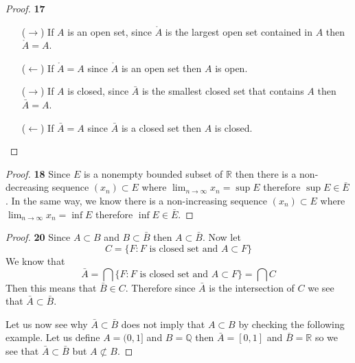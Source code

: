 \documentclass[11pt]{article}
\newcommand{\Q}{\mathbb{Q}}
\newcommand{\R}{\mathbb{R}}
\theoremstyle{definition}
\begin{document}
	\begin{proof}{\textbf{17}}
        \begin{itemize}
        \item [($\rightarrow$)] If $A$ is an open set, since $\mathring{A}$ is the
        largest open set contained in $A$ then $\mathring{A} = A$.
        \item [($\leftarrow$)] If $\mathring{A} = A$ since $\mathring{A}$ is an open set
        then $A$ is open.
        \end{itemize}
        \begin{itemize}
        \item [($\rightarrow$)] If $A$ is closed, since $\bar{A}$ is the smallest closed
        set that contains $A$ then $\bar{A} = A$.
        \item [($\leftarrow$)] If $\bar{A} = A$ since $\bar{A}$ is a closed set
        then $A$ is closed.
        \end{itemize}
    \end{proof}
	\begin{proof}{\textbf{18}}
        Since $E$ is a nonempty bounded subset of $\R$ then there is a non-decreasing
        sequence $(x_n) \subset E$ where $\lim_{n \to \infty} x_n = \sup{E}$ therefore
        $\sup{E} \in \bar{E}$. In the same way, we know there is a non-increasing
        sequence $(x_n) \subset E$ where $\lim_{n \to \infty} x_n = \inf{E}$ therefore
        $\inf{E} \in \bar{E}$.
    \end{proof}
	\begin{proof}{\textbf{20}}
        Since $A \subset B$ and $B \subset \bar{B}$ then $A \subset \bar{B}$.
        Now let
        $$C = \{F: F\text{ is closed set and }A \subset F\}$$
        We know that
        $$\bar{A} = \bigcap\{F: F\text{ is closed set and }A \subset F\} = \bigcap C$$
        Then this means that $\bar{B} \in C$.
        Therefore since $\bar{A}$ is the intersection of $C$ we see that
        $\bar{A} \subset \bar{B}$.

        Let us now see why $\bar{A} \subset \bar{B}$ does not imply that
        $A \subset B$ by checking the following example. Let us
        define $A = (0, 1]$ and $B = \Q$ then $\bar{A} = [0, 1]$ and
        $\bar{B} = \R$ so we see that $\bar{A} \subset \bar{B}$ but
        $A \not\subset B$.
    \end{proof}
\end{document}
